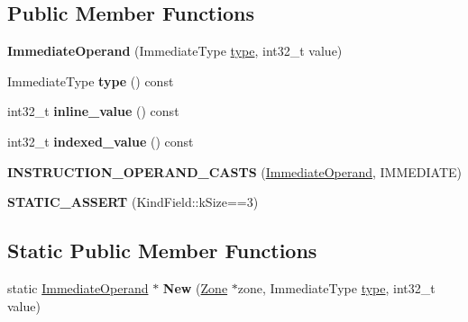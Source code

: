 \subsection*{Public Member Functions}
\begin{DoxyCompactItemize}
\item 
\mbox{\label{classv8_1_1internal_1_1compiler_1_1ImmediateOperand_a360a2f07db2401cc42400d083d9fbe66}} 
{\bfseries Immediate\+Operand} (Immediate\+Type \mbox{\hyperlink{classstd_1_1conditional_1_1type}{type}}, int32\+\_\+t value)
\item 
\mbox{\label{classv8_1_1internal_1_1compiler_1_1ImmediateOperand_ad27b9b489c68668cbd889aab7ca5ed95}} 
Immediate\+Type {\bfseries type} () const
\item 
\mbox{\label{classv8_1_1internal_1_1compiler_1_1ImmediateOperand_a95755b7d4fc0af43d75f3bdccf17345a}} 
int32\+\_\+t {\bfseries inline\+\_\+value} () const
\item 
\mbox{\label{classv8_1_1internal_1_1compiler_1_1ImmediateOperand_ae6dc83a8f5a627d40b9b173b96395560}} 
int32\+\_\+t {\bfseries indexed\+\_\+value} () const
\item 
\mbox{\label{classv8_1_1internal_1_1compiler_1_1ImmediateOperand_a4b66eecf00f82c70d0eb19d5955c5d9b}} 
{\bfseries I\+N\+S\+T\+R\+U\+C\+T\+I\+O\+N\+\_\+\+O\+P\+E\+R\+A\+N\+D\+\_\+\+C\+A\+S\+TS} (\mbox{\hyperlink{classv8_1_1internal_1_1compiler_1_1ImmediateOperand}{Immediate\+Operand}}, I\+M\+M\+E\+D\+I\+A\+TE)
\item 
\mbox{\label{classv8_1_1internal_1_1compiler_1_1ImmediateOperand_ac72ffc12a25b4c120f4daca4062b8920}} 
{\bfseries S\+T\+A\+T\+I\+C\+\_\+\+A\+S\+S\+E\+RT} (Kind\+Field\+::k\+Size==3)
\end{DoxyCompactItemize}
\subsection*{Static Public Member Functions}
\begin{DoxyCompactItemize}
\item 
\mbox{\label{classv8_1_1internal_1_1compiler_1_1ImmediateOperand_a9c4a87d374f9a383ee1bce00efe5e64b}} 
static \mbox{\hyperlink{classv8_1_1internal_1_1compiler_1_1ImmediateOperand}{Immediate\+Operand}} $\ast$ {\bfseries New} (\mbox{\hyperlink{classv8_1_1internal_1_1Zone}{Zone}} $\ast$zone, Immediate\+Type \mbox{\hyperlink{classstd_1_1conditional_1_1type}{type}}, int32\+\_\+t value)
\end{DoxyCompactItemize}
